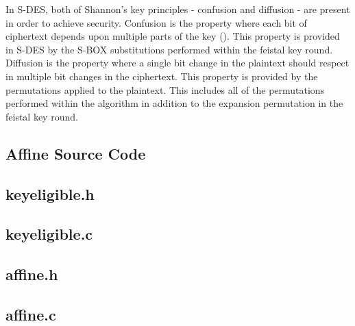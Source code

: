 \documentclass[]{article}
\begin{document}
In S-DES, both of Shannon's key principles - confusion and diffusion - are present in order to achieve security. Confusion is the property where each bit of ciphertext depends upon multiple parts of the key (\cite{maintext}). This property is provided in S-DES by the S-BOX substitutions performed within the feistal key round.\\

 Diffusion is the property where a single bit change in the plaintext should respect in multiple bit changes in the ciphertext. This property is provided by the permutations applied to the plaintext. This includes all of the permutations performed within the algorithm in addition to the expansion permutation in the feistal key round.

\pagebreak


\vspace*{-0.8cm}
\begin{center}
	\section*{Affine Source Code}
\end{center}

\subsection*{keyeligible.h}
\pagebreak{}
\subsection*{keyeligible.c}
\pagebreak{}
\subsection*{affine.h}
\pagebreak{}
\subsection*{affine.c}
\pagebreak{}

\end{document}
